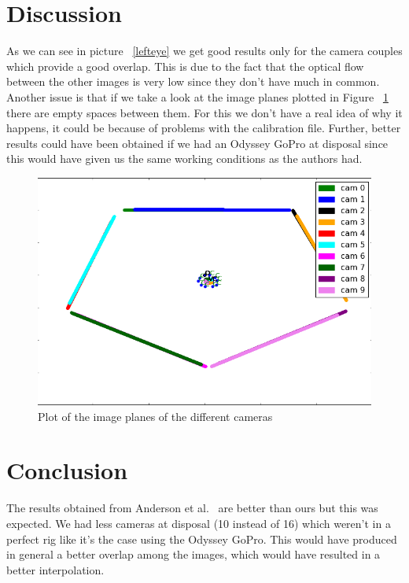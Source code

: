 \documentclass[10pt,twocolumn,letterpaper]{article}
\begin{document}
\section{Discussion}
As we can see in picture ~\ref{lefteye} we get good results only for the camera couples which provide a good overlap. This is due to the fact that the optical flow between the other images is very low since they don't have much in common. Another issue is that if we take a look at the image planes plotted in Figure ~\ref{imageplanes} there are empty spaces between them. For this we don't have a real idea of why it happens, it could be because of problems with the calibration file.
Further, better results could have been obtained if we had an Odyssey GoPro at disposal since this would have given us the same working conditions as the authors had.
\begin{figure}[t]
\begin{center}
   \includegraphics[width=0.7\linewidth]{pictures/rig_detailed.png}
\end{center}
   \caption{Plot of the image planes of the different cameras}
\label{imageplanes}
\end{figure}
\section{Conclusion}
The results obtained from Anderson et al.~\cite{jump16} are better than ours but this was expected. We had less cameras at disposal (10 instead of 16) which weren't in a perfect rig like it's the case using the Odyssey GoPro. This would have produced in general a better overlap among the images, which would have resulted in a better interpolation.

{\small


}
\end{document}
